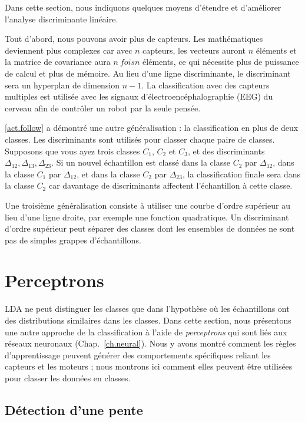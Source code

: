 Dans cette section, nous indiquons quelques moyens d'étendre et d'améliorer l'analyse discriminante linéaire.

Tout d'abord, nous pouvons avoir plus de capteurs. Les mathématiques deviennent plus complexes car avec $n$ capteurs, les vecteurs auront $n$ éléments et la matrice de covariance aura $n\ fois n$ éléments, ce qui nécessite plus de puissance de calcul et plus de mémoire. Au lieu d'une ligne discriminante, le discriminant sera un hyperplan de dimension $n-1$. La classification avec des capteurs multiples est utilisée avec les signaux d'électroencéphalographie (EEG) du cerveau afin de contrôler un robot par la seule pensée.

\ref{act.follow} a démontré une autre généralisation : la classification en plus de deux classes. Les discriminants sont utilisés pour classer chaque paire de classes. Supposons que vous ayez trois classes $C_1$, $C_2$ et $C_3$, et des discriminants $\Delta_{12}, \Delta_{13}, \Delta_{23}$. Si un nouvel échantillon est classé dans la classe $C_2$ par $\Delta_{12}$, dans la classe $C_1$ par $\Delta_{12}$, et dans la classe $C_2$ par $\Delta_{23}$, la classification finale sera dans la classe $C_2$ car davantage de discriminants affectent l'échantillon à cette classe.

Une troisième généralisation consiste à utiliser une courbe d'ordre supérieur au lieu d'une ligne droite, par exemple une fonction quadratique. Un discriminant d'ordre supérieur peut séparer des classes dont les ensembles de données ne sont pas de simples grappes d'échantillons.

\section{Perceptrons}\label{s.perceptrons}

LDA ne peut distinguer les classes que dans l'hypothèse où les échantillons ont des distributions similaires dans les classes. Dans cette section, nous présentons une autre approche de la classification à l'aide de \emph{perceptrons} qui sont liés aux réseaux neuronaux (Chap.~\ref{ch.neural}). Nous y avons montré comment les règles d'apprentissage peuvent générer des comportements spécifiques reliant les capteurs et les moteurs ; nous montrons ici comment elles peuvent être utilisées pour classer les données en classes.

\subsection{Détection d'une pente}\label{s.detect-slope}

